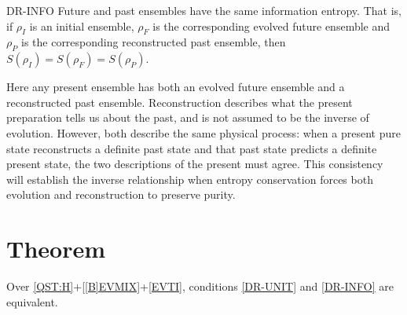\documentclass{techbrief}
\begin{document}
\begin{condition}{DR-INFO}
	Future and past ensembles have the same information entropy. That is, if $\rho_I$ is an initial ensemble, $\rho_F$ is the corresponding evolved future ensemble and $\rho_P$ is the corresponding reconstructed past ensemble, then $S(\rho_I) = S(\rho_F) = S(\rho_P)$.
\end{condition}
Here any present ensemble has both an evolved future ensemble and a reconstructed past ensemble. Reconstruction describes what the present preparation tells us about the past, and is not assumed to be the inverse of evolution. However, both describe the same physical process: when a present pure state reconstructs a definite past state and that past state predicts a definite present state, the two descriptions of the present must agree. This consistency will establish the inverse relationship when entropy conservation forces both evolution and reconstruction to preserve purity.

\section{Theorem}

\begin{thrm}
	Over \ref{QST:H}+\ref{[B]EVMIX}+\ref{EVTI}, conditions \ref{DR-UNIT} and \ref{DR-INFO} are equivalent.
\end{thrm}
\end{document}
